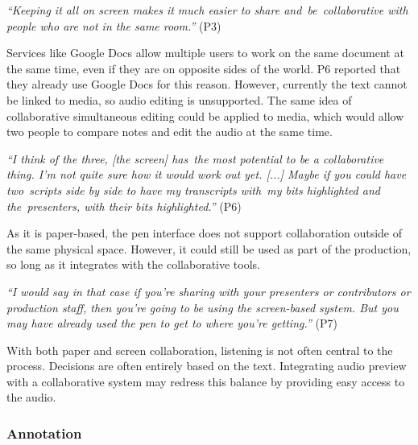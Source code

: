 \textit{``Keeping it all on screen makes it much easier to share and be collaborative with people who are not in the
same room.''} (P3)

Services like Google Docs allow multiple users to work on the same document at the same time, even if they are on
opposite sides of the world. P6 reported that they already use Google Docs for this reason. However, currently the text
cannot be linked to media, so audio editing is unsupported. The same idea of collaborative simultaneous editing could
be applied to media, which would allow two people to compare notes and edit the audio at the same time.

\textit{``I think of the three, [the screen] has the most potential to be a collaborative thing. I'm not quite sure how
  it would work out yet. [...]
  Maybe if you could have two scripts side by side to have my transcripts with my bits highlighted and the presenters,
  with their bits highlighted.''} (P6)

As it is paper-based, the pen interface does not support collaboration outside of the same physical space. However,
it could still be used as part of the production, so long as it integrates with the collaborative tools.

\textit{``I would say in that case if you're sharing with your presenters or contributors or production staff, then
  you're going to be using the screen-based system. But you may have already used the pen to get to where you're
  getting.''} (P7)


With both paper and screen collaboration, listening is not often central to the process. Decisions are often entirely
based on the text. Integrating audio preview with a collaborative system may redress this balance by providing easy
access to the audio.

\subsubsection{Annotation}



